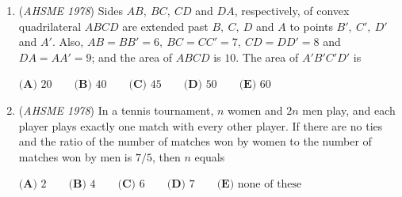 \begin{enumerate}
	\item (\textit{AHSME 1978}) Sides $AB,~ BC, ~CD$ and $DA$, respectively, of convex quadrilateral $ABCD$ are extended past $B,~ C ,~ D$ and $A$ to points $B',~C',~ D'$ and $A'$. 
Also, $AB = BB' = 6,~ BC = CC' = 7, ~CD = DD' = 8$ and $DA = AA' = 9$; and the area of $ABCD$ is $10$. The area of $A 'B 'C'D'$ is


 $\textbf{(A) }20\qquad \textbf{(B) }40\qquad \textbf{(C) }45\qquad \textbf{(D) }50\qquad  \textbf{(E) }60$


	\item (\textit{AHSME 1978}) In a tennis tournament, $n$ women and $2n$ men play, and each player plays exactly one match with every other player. 
If there are no ties and the ratio of the number of matches won by women to the number of matches won by men is $7/5$, then $n$ equals


 $\textbf{(A) }2\qquad \textbf{(B) }4\qquad \textbf{(C) }6\qquad \textbf{(D) }7\qquad  \textbf{(E) }\text{none of these}$


\end{enumerate}